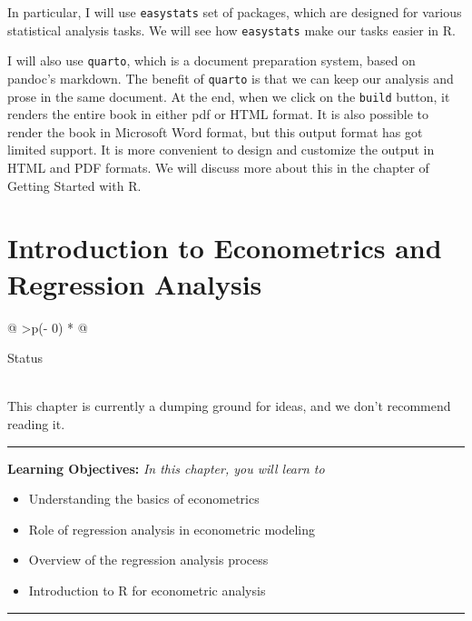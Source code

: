 \documentclass[
  letterpaper,
  paper =a4,
  twoside,
  openright,
  headsepline,
  footsepline,
  listof = totocnumbered,
  chapterprefix = true,
  firstiscover,
  parskip = full*]{scrbook}
\providecommand{\abstractname}{Learning Objectives} %
\newenvironment{objectives}[1]{%
	\hrule
	\vspace{5pt}
	\small\textbf{\abstractname: } 
	\newline
	\vspace{0.1cm}
	\small\emph{#1} %
	\itshape %
}{%
	\vspace{5pt}
	\hrule
	\vspace{0.6cm}
}
\begin{document}
In particular, I will use \texttt{easystats} set of packages, which are
designed for various statistical analysis tasks. We will see how
\texttt{easystats} make our tasks easier in R.

I will also use \texttt{quarto}, which is a document preparation system,
based on pandoc's markdown. The benefit of \texttt{quarto} is that we
can keep our analysis and prose in the same document. At the end, when
we click on the \texttt{build} button, it renders the entire book in
either pdf or HTML format. It is also possible to render the book in
Microsoft Word format, but this output format has got limited support.
It is more convenient to design and customize the output in HTML and PDF
formats. We will discuss more about this in the chapter of Getting
Started with R.


\chapter{Introduction to Econometrics and Regression
Analysis}\label{introduction-to-econometrics-and-regression-analysis}

\begin{longtable}[]{@{}
  >{\centering\arraybackslash}p{(\columnwidth - 0\tabcolsep) * }@{}}
\toprule\noalign{}
\begin{minipage}[b]{\linewidth}\centering
Status
\end{minipage} \\
\midrule\noalign{}
\endhead
\bottomrule\noalign{}
\endlastfoot
This chapter is currently a dumping ground for ideas, and we don't
recommend reading it. \\
\end{longtable}

\begin{objectives}{In this chapter, you will learn to}
\begin{itemize}

\item{Understanding the basics of econometrics}

\item{Role of regression analysis in econometric modeling}

\item{Overview of the regression analysis process}

\item{Introduction to R for econometric analysis}

\end{itemize}

\end{objectives}
\end{document}
